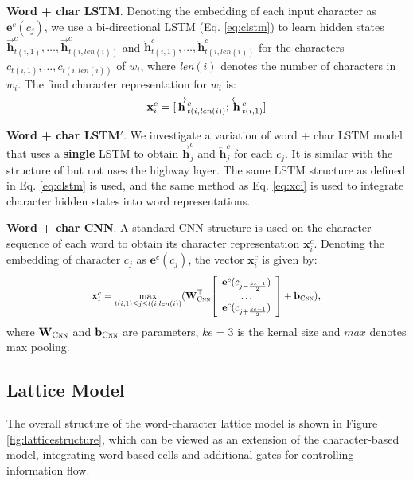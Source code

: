 \documentclass[11pt,a4paper]{article}
\newcommand*{\Scale}[2][4]{\scalebox{#1}{$#2$}}
\begin{document}
\begin{CJK*}{UTF8}{gbsn}
\noindent  \textbullet \; \textbf{Word + char LSTM}. Denoting the embedding of each input character as $\textbf{e}^c(c_j)$, we use a bi-directional LSTM (Eq. \ref{eq:clstm}) to learn hidden states $\overrightarrow{\textbf{h}}^c_{t(i, 1)}, \ldots, \overrightarrow{\textbf{h}}^c_{t(i, \textit{len}(i))}$ and $\overleftarrow{\textbf{h}}^c_{t(i, 1)}, \ldots, \overleftarrow{\textbf{h}}^c_{t(i, \textit{len}(i))}$ for the characters $c_{t(i, 1)}, \ldots, c_{t(i,\textit{len}(i))}$ of $w_i$, where \textit{len}$(i)$ denotes the number of characters in $w_i$. The final character representation for $w_i$ is:
\begin{equation}\label{eq:xci}
\textbf{x}^c_i=[\overrightarrow{\textbf{h}}^c_{t(i,{\it len}(i))}; \overleftarrow{\textbf{h}}^c_{t(i, 1)}]
\end{equation}

\noindent \textbullet \; \textbf{Word + char LSTM$'$}. We investigate a variation of word + char LSTM model that uses a \textbf{single} LSTM to obtain $\overrightarrow{\textbf{h}}^c_j$ and $\overleftarrow{\textbf{h}}^c_j$ for each $c_j$. It is similar with the structure of  but not uses the highway layer. The same LSTM structure as defined in Eq. \ref{eq:clstm} is used, and the same method as Eq. \ref{eq:xci} is used to integrate character hidden states into word representations. 

\noindent \textbullet \; \textbf{Word + char CNN}. A standard CNN \cite{lecun1989backpropagation} structure is used on the character sequence of each word to obtain its character representation $\textbf{x}^c_i$. Denoting the embedding of character $c_j$ as $\textbf{e}^c(c_j)$, the vector $\textbf{x}^c_i$ is given by:
\begin{equation}
\Scale[0.87]{
\textbf{x}^c_i=\max \limits_{t(i,1)\le j\le t(i,len(i))}(\textbf{W}^\top_{\textsc{Cnn}}
{\left[ \begin{array}{c}
\textbf{e}^c(c_{j-\frac{ke-1}{2}}) \\
\ldots \\
\textbf{e}^c(c_{j+\frac{ke-1}{2}})\\ 
\end{array} 
\right ]} 
 + \textbf{b}_{\textsc{Cnn}})
 },
\end{equation}
where $\textbf{W}_{\textsc{Cnn}}$ and $\textbf{b}_{\textsc{Cnn}}$ are parameters, $ke=3$ is the kernal size and $max$ denotes max pooling.




\subsection{Lattice Model}
The overall structure of the word-character lattice model is shown in Figure \ref{fig:latticestructure}, which can be viewed as an extension of the character-based model, integrating word-based cells and additional gates for controlling information flow.  


\end{CJK*}
\end{document}
